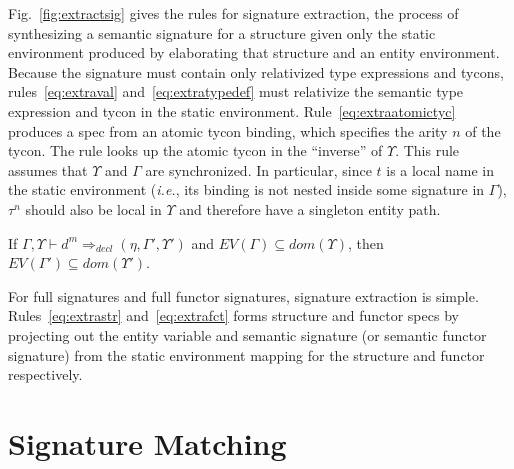 

Fig.~\ref{fig:extractsig} gives the rules for signature extraction, the process of synthesizing a semantic signature for a structure given only the static environment produced by elaborating that structure and an entity environment. Because the signature must contain only relativized type expressions and tycons, rules~\ref{eq:extraval} and~\ref{eq:extratypedef} must relativize the semantic type expression and tycon in the static environment. Rule~\ref{eq:extraatomictyc} produces a spec from an atomic tycon binding, which specifies the arity $n$ of the tycon. The rule looks up the atomic tycon in the ``inverse'' of $\Upsilon$. This rule assumes that $\Upsilon$ and $\Gamma$ are synchronized. In particular, since $t$ is a local name in the static environment (\emph{i.e.}, its binding is not nested inside some signature in $\Gamma$), $\tau^n$ should also be local in $\Upsilon$ and therefore have a singleton entity path. 
 
\begin{lemma}
If $\Gamma,\Upsilon \vdash d^m \Rightarrow_{decl} (\eta, \Gamma', \Upsilon')$ and $EV(\Gamma)\subseteq dom(\Upsilon)$, then $EV(\Gamma')\subseteq dom(\Upsilon')$. 
\end{lemma}

For full signatures and full functor signatures, signature extraction is simple. Rules~\ref{eq:extrastr} and~\ref{eq:extrafct} forms structure and functor specs by projecting out the entity variable and semantic signature (or semantic functor signature) from the static environment mapping for the structure and functor respectively. 

\section{Signature Matching}\label{sec:sigmatch}





